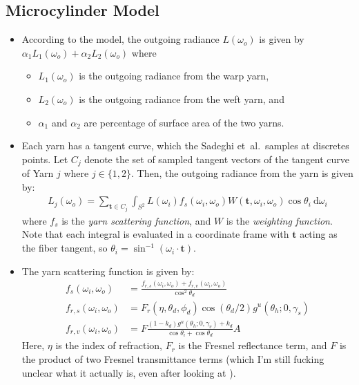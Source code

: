 \documentclass[10pt]{article}
\newcommand{\dee}{\mathrm{d}}
\newcommand{\ve}[1]{\mathbf{#1}}
\newcommand{\etal}{{et~al.}}
\begin{document}
  \subsection{Microcylinder Model}
  
  \begin{itemize}
    \item According to the model, the outgoing radiance $L(\omega_o)$ is given by $\alpha_1 L_1(\omega_o) + \alpha_2 L_2(\omega_o)$ where
    \begin{itemize}
      \item $L_1(\omega_o)$ is the outgoing radiance from the warp yarn,
      \item $L_2(\omega_o)$ is the outgoing radiance from the weft yarn, and
      \item $\alpha_1$ and $\alpha_2$ are percentage of surface area of the two yarns.      
    \end{itemize}
    
    \item Each yarn has a tangent curve, which the Sadeghi \etal\ samples at discretes points.  Let $C_j$ denote the set of sampled tangent vectors of the tangent curve of Yarn $j$ where $j \in \{1,2\}$.  Then, the outgoing radiance from the yarn is given by:
    \begin{align*}
      L_j(\omega_o) = \sum_{\ve{t} \in C_j} \int_{S^2} L(\omega_i) f_s(\omega_i, \omega_o) W(\ve{t}, \omega_i, \omega_o) \cos\theta_i\ \dee \omega_i
    \end{align*}
    where $f_s$ is the \emph{yarn scattering function}, and $W$ is the \emph{weighting function}.  Note that each integral is evaluated in a coordinate frame with $\ve{t}$ acting as the fiber tangent, so $\theta_i = \sin^{-1}(\omega_i \cdot \ve{t}).$ 

    \item The yarn scattering function is given by:
    \begin{align*}
      f_s(\omega_i,\omega_o) 
      &= \frac{f_{r,s}(\omega_i,\omega_o) + f_{r,v}(\omega_i,\omega_o)}{\cos^2 \theta_d} \\
      f_{r,s}(\omega_i,\omega_o)
      &= F_r(\eta, \theta_d, \phi_d) \cos(\theta_d/2) g^u(\theta_h; 0, \gamma_s) \\
      f_{r,v}(\omega_i,\omega_o)
      &= F \frac{(1-k_d)g^u(\theta_h; 0, \gamma_v) + k_d}{\cos\theta_i + \cos\theta_d} A
    \end{align*}
    Here, $\eta$ is the index of refraction, $F_r$ is the Fresnel reflectance term, and $F$ is the product of two Fresnel transmittance terms (which I'm still fucking unclear what it actually is, even after looking at \cite{Sadeghi:2013}).


\end{itemize}
\end{document}
